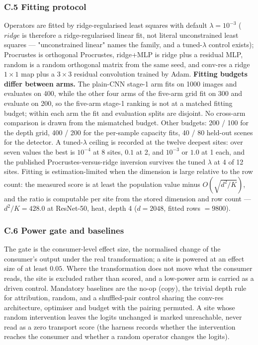 \subsubsection*{C.5 Fitting protocol}

Operators are fitted by ridge-regularised least squares with default $\lambda=10^{-3}$ ($ridge$ is therefore a ridge-regularised linear fit, not literal unconstrained least squares --- "unconstrained linear" names the family, and a tuned-$\lambda$ control exists); Procrustes is orthogonal Procrustes, ridge+MLP is ridge plus a residual MLP, random is a random orthogonal matrix from the same seed, and conv-res a ridge $1\times1$ map plus a $3\times3$ residual convolution trained by Adam. \textbf{Fitting budgets differ between arms.} The plain-CNN stage-1 arm fits on 1000 images and evaluates on 400, while the other four arms of the five-arm grid fit on 300 and evaluate on 200, so the five-arm stage-1 ranking is not at a matched fitting budget; within each arm the fit and evaluation splits are disjoint. No cross-arm comparison is drawn from the mismatched budget. Other budgets: 200 / 100 for the depth grid, 400 / 200 for the per-sample capacity fits, 40 / 80 held-out scenes for the detector. A tuned-$\lambda$ ceiling is recorded at the twelve deepest sites: over seven values the best is $10^{-4}$ at 8 sites, $0.1$ at 2, and $10^{-3}$ or $1.0$ at 1 each, and the published Procrustes-versus-ridge inversion survives the tuned $\lambda$ at 4 of 12 sites. Fitting is estimation-limited when the dimension is large relative to the row count: the measured score is at least the population value minus $O(\sqrt{d^2/K})$, and the ratio is computable per site from the stored dimension and row count --- $d^2/K=428.0$ at ResNet-50, heat, depth 4 ($d=2048$, fitted rows $=9800$).

\subsubsection*{C.6 Power gate and baselines}

The gate is the consumer-level effect size, the normalised change of the consumer's output under the real transformation; a site is powered at an effect size of at least $0.05$. Where the transformation does not move what the consumer reads, the site is excluded rather than scored, and a low-power arm is carried as a driven control. Mandatory baselines are the no-op (copy), the trivial depth rule for attribution, random, and a shuffled-pair control sharing the conv-res architecture, optimiser and budget with the pairing permuted. A site whose random intervention leaves the logits unchanged is marked unreachable, never read as a zero transport score (the harness records whether the intervention reaches the consumer and whether a random operator changes the logits).


